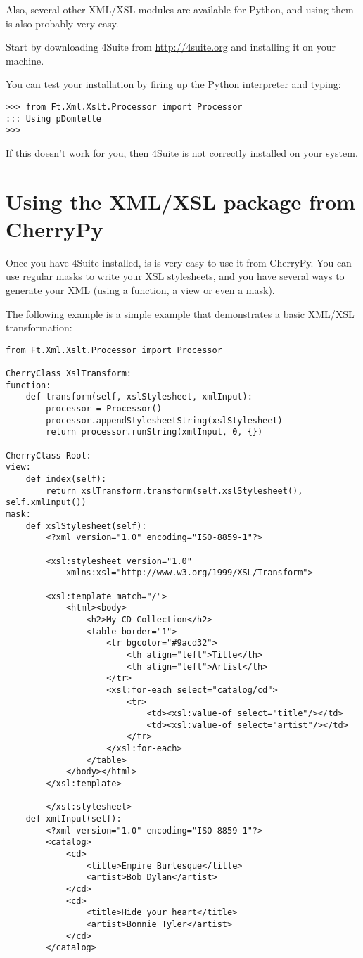 \documentclass{manual}
\begin{document}
Also, several other XML/XSL modules are available for Python, and using them is also probably very easy.

Start by downloading 4Suite from \url{http://4suite.org} and installing it on your machine.

You can test your installation by firing up the Python interpreter and typing:
\begin{verbatim}
>>> from Ft.Xml.Xslt.Processor import Processor
::: Using pDomlette
>>>
\end{verbatim}
If this doesn't work for you, then 4Suite is not correctly installed on your system.

\section{Using the XML/XSL package from CherryPy}

Once you have 4Suite installed, is is very easy to use it from CherryPy. You can use regular masks to write your XSL
stylesheets, and you have several ways to generate your XML (using a function, a view or even a mask).

The following example is a simple example that demonstrates a basic XML/XSL transformation:

\begin{verbatim}
from Ft.Xml.Xslt.Processor import Processor

CherryClass XslTransform:
function:
    def transform(self, xslStylesheet, xmlInput):
        processor = Processor()
        processor.appendStylesheetString(xslStylesheet)
        return processor.runString(xmlInput, 0, {})

CherryClass Root:
view:
    def index(self):
        return xslTransform.transform(self.xslStylesheet(), self.xmlInput())
mask:
    def xslStylesheet(self):
        <?xml version="1.0" encoding="ISO-8859-1"?>

        <xsl:stylesheet version="1.0"
            xmlns:xsl="http://www.w3.org/1999/XSL/Transform">

        <xsl:template match="/">
            <html><body>
                <h2>My CD Collection</h2>
                <table border="1">
                    <tr bgcolor="#9acd32">
                        <th align="left">Title</th>
                        <th align="left">Artist</th>
                    </tr>
                    <xsl:for-each select="catalog/cd">
                        <tr>
                            <td><xsl:value-of select="title"/></td>
                            <td><xsl:value-of select="artist"/></td>
                        </tr>
                    </xsl:for-each>
                </table>
            </body></html>
        </xsl:template>

        </xsl:stylesheet> 
    def xmlInput(self):
        <?xml version="1.0" encoding="ISO-8859-1"?>
        <catalog>
            <cd>
                <title>Empire Burlesque</title>
                <artist>Bob Dylan</artist>
            </cd>
            <cd>
                <title>Hide your heart</title>
                <artist>Bonnie Tyler</artist>
            </cd>
        </catalog>
\end{verbatim}
\end{document}
